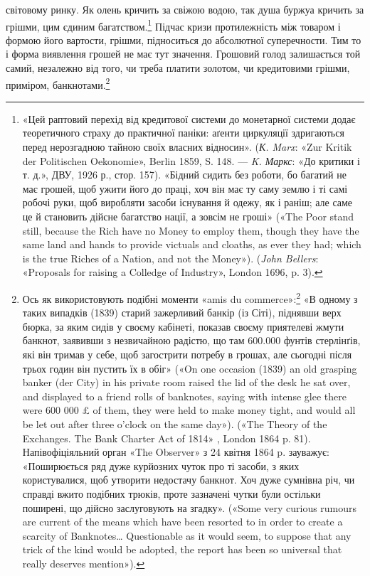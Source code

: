 \parcont{}  %
світовому ринку. Як олень кричить за свіжою водою, так душа буржуа кричить за грішми, цим єдиним
багатством.\footnote{
«Цей раптовий перехід від кредитової системи до монетарної системи додає теоретичного страху до
практичної паніки: аґенти циркуляції здригаються перед нерозгадною тайною своїх власних відносин».
(\emph{К. Marx}: «Zur Kritik der Politischen Oekonomie», Berlin 1859, S. 148. — \emph{K. Маркс}: «До критики і т.
д.», ДВУ, 1926 р., стор. 157). «Бідний сидить без роботи, бо багатий не має грошей, щоб ужити його
до праці, хоч він має ту саму землю і ті самі робочі руки, щоб виробляти засоби існування й одежу,
як і раніш; але саме це й становить дійсне багатство нації, а зовсім не гроші» («The Poor stand
still, because the Rich have no Money to employ them, though they have the same land and hands to
provide victuals and cloaths, as ever they had; which is the true Riches of a Nation, and not the
Money»). (\emph{John Bellers}: «Proposals for raising a Colledge of
Industry», London 1696, p. 3).
} Підчас кризи протилежність між товаром і формою його вартости, грішми, підноситься до
абсолютної суперечности. Тим то і форма виявлення грошей не має тут значення. Грошовий голод
залишається той самий, незалежно від того, чи треба платити золотом, чи кредитовими грішми,
приміром, банкнотами.\footnote{
Ось як використовують подібні моменти «amis du commerce»:\footnote*{
— друзі торговлі. \emph{Ред.}
} «В одному з таких випадків (1839)
старий зажерливий банкір (із Сіті), піднявши верх бюрка, за яким сидів у своєму кабінеті, показав
своєму приятелеві жмути банкнот, заявивши з незвичайною радістю, що там 600.000 фунтів стерлінґів,
які він тримав у себе, щоб загострити потребу в грошах, але сьогодні після трьох годин він пустить
їх в обіг» («On one occasion (1839) an old grasping banker (der City) in his private room raised the
lid of the desk he sat over, and displayed to a friend rolls of banknotes, saying with intense glee
there were 600 000 £ of them, they were held to make money tight, and would all be let out after
three o'clock on the same day»). («The Theory of the Exchanges. The Bank Charter Act of 1814» ,
London 1864 p. 81). Напівофіціяльний орган «The Observer» з 24 квітня 1864 p. зауважує: «Поширюється
ряд дуже курйозних чуток про ті засоби, з яких користувалися, щоб утворити недостачу банкнот. Хоч
дуже сумнівна річ, чи справді вжито подібних трюків, проте зазначені чутки були остільки поширені,
що дійсно заслуговують на згадку». («Some very curious rumours are current of the means which have
been resorted to in order to create a scarcity of Banknotes\dots{} Questionable as it would seem, to
suppose that any trick of the kind would be adopted, the report has been so universal that really
deserves mention»).
}


